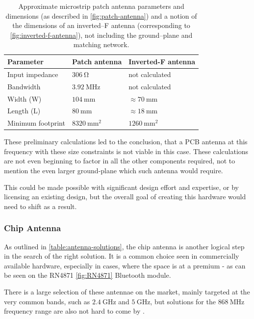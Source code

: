 \begin{table}[H]
\begin{center}
\caption{\label{table:antenna-pcb-calculations}Approximate microstrip patch antenna parameters and dimensions (as described in \ref{fig:patch-antenna}) and a notion of the dimensions of an inverted--F antenna (corresponding to \ref{fig:inverted-f-antenna}), not including the ground--plane and matching network.}
    \begin{tabular}{|l|l|l|} \hline
    \textbf{Parameter}  & \textbf{Patch antenna}    & \textbf{Inverted-F antenna} \\ \hline
    Input impedance     & $306~\mathrm{\Omega}$     & not calculated \\ \hline
    Bandwidth           & $3.92~\mathrm{MHz}$       & not calculated \\ \hline
    Width (W)           & $104~\mathrm{mm}$         & $\approx 70~\mathrm{mm}$ \\ \hline
    Length (L)          & $80~\mathrm{mm}$          & $\approx 18~\mathrm{mm}$ \\ \hline
    Minimum footprint   & $8320~\mathrm{mm^2}$      & $1260~\mathrm{mm^2}$ \\ \hline
    \end{tabular}
\end{center}
\end{table}

These preliminary calculations led to the conclusion, that a PCB antenna at this frequency with these size constraints is not viable in this case. These calculations are not even beginning to factor in all the other components required, not to mention the even larger ground-plane which such antenna would require. 

This could be made possible with significant design effort and expertise, or by licensing an existing design, but the overall goal of creating this hardware would need to shift as a result.

\subsubsection{Chip Antenna}
As outlined in \ref{table:antenna-solutions}, the chip antenna is another logical step in the search of the right solution. It is a common choice seen in commercially available hardware, especially in cases, where the space is at a premium - as can be seen on the RN4871 \ref{fig:RN4871} Bluetooth module.

There is a large selection of these antennae on the market, mainly targeted at the very common bands, such as $2.4~\mathrm{GHz}$ and $5~\mathrm{GHz}$, but solutions for the $868~\mathrm{MHz}$ frequency range are also not hard to come by \cite{digikey_rf_2024,mouser_europe_868_2024}.

